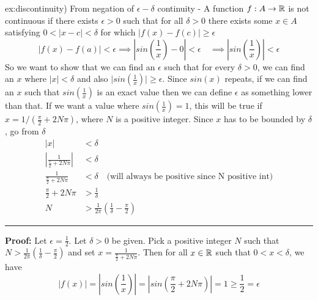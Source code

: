 \documentclass[landscape, 8pt]{extarticle}
\begin{document}
\begin{multicols}{3}
\begin{xmp}{ex:discontinuity}{)}
    From negation of $\epsilon-\delta$ continuity - A function $f:A\to\mathbb{R}$ is not continuous if there exists $\epsilon>0$ such that for all $\delta>0$ there exists some $x \in A$ satisfying $0<\lvert x-c \rvert<\delta$ for which $\lvert  f(x)-f(c) \rvert\ge \epsilon$
    \[\lvert f(x) - f(a)\rvert < \epsilon \implies \left\lvert sin\left(\frac{1}{x}\right) - 0 \right\rvert < \epsilon \quad \implies \left\lvert sin\left(\frac{1}{x}\right)\right\rvert < \epsilon\]
    So we want to show that we can find an $\epsilon$ such that for every $\delta > 0$, we can find an $x$ where $\lvert x\rvert < \delta$ and also $\lvert sin(\frac{1}{x})\rvert \ge \epsilon$.
    \vspace{0pt}\newline
    Since $sin(x)$ repeats, if we can find an $x$ such that $sin(\frac{1}{x})$ is an exact value then we can define $\epsilon$ as something lower than that. If we want a value where $sin(\frac{1}{x}) = 1$, this will be true if $x = 1 / (\frac{\pi}{2} + 2N\pi)$, where $N$ is a positive integer.
    \vspace{0pt}\newline
    Since $x$ has to be bounded by $\delta$, go from $\delta$
    \[\begin{aligned}
        \lvert x\rvert  &< \delta\\
        \left\lvert \frac{1}{\frac{\pi}{2}+2N\pi}\right\rvert &< \delta\\
        \frac{1}{\frac{\pi}{2}+2N\pi} &< \delta \quad \text{(will always be positive since N positive int)}\\ 
        \frac{\pi}{2}+2N\pi &> \frac{1}{\delta}\\
        N &> \frac{1}{2\pi}\left( \frac{1}{\delta} - \frac{\pi}{2} \right)
    \end{aligned}\]
    \vspace{3pt}
    \hrule
    \vspace{3pt}
    \noindent\textbf{Proof:} Let $\epsilon = \frac{1}{2}$. Let $\delta > 0$ be given. Pick a positive integer $N$ such that $N > \frac{1}{2\pi}\left( \frac{1}{\delta} - \frac{\pi}{2} \right)$ and set $x = \frac{1}{\frac{\pi}{2} + 2N\pi}$. Then for all $x\in \mathbb{R}$ such that $0 < x < \delta$, we have
    \[\lvert f(x)\rvert = \left\lvert sin\left(\frac{1}{x}\right) \right\rvert = \left\lvert sin\left(\frac{\pi}{2} + 2N\pi\right) \right\rvert = 1 \ge \frac{1}{2} = \epsilon\]
\end{xmp}
\vspace{-5pt}


\end{multicols}
\end{document}
